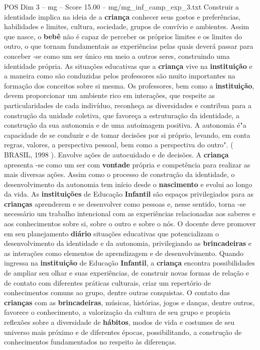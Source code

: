 \begin{textsample}{POS Dim 3 – mg – Score 15.00 – mg/mg\_inf\_camp\_exp\_3.txt}
Construir a identidade implica na ideia de a \textbf{criança} conhecer seus gostos e preferências, habilidades e limites, cultura, sociedade, grupos de convívio e ambientes.
Assim que nasce, o \textbf{bebê} não é capaz de perceber os próprios limites e os limites do outro, o que tornam fundamentais as experiências pelas quais deverá passar para conceber -se como um ser único em meio a outros seres, construindo uma identidade própria.
As situações educativas que a \textbf{criança} vive na \textbf{instituição} e a maneira como são conduzidas pelos professores são muito importantes na formação dos conceitos sobre si mesma.
Os professores, bem como a \textbf{instituição}, devem proporcionar um ambiente rico em interações, que respeite as particularidades de cada indivíduo, reconheça as diversidades e contribua para a construção da unidade coletiva, que favoreça a estruturação da identidade, a construção da sua autonomia e de uma autoimagem positiva.
A autonomia é"a capacidade de se conduzir e de tomar decisões por si próprio, levando, em conta regras, valores, a perspectiva pessoal, bem como a perspectiva do outro". ( BRASIL, 1998 ).
Envolve ações de autocuidado e de decisões.
A \textbf{criança} apresenta -se como um ser com \textbf{vontade} própria e competência para realizar as mais diversas ações.
Assim como o processo de construção da identidade, o desenvolvimento da autonomia tem início desde o \textbf{nascimento} e evolui ao longo da vida.
As \textbf{instituições} de Educação \textbf{Infantil} são espaços privilegiados para as \textbf{crianças} aprenderem e se desenvolver como pessoas e, nesse sentido, torna -se necessário um trabalho intencional com as experiências relacionadas aos saberes e aos conhecimentos sobre si, sobre o outro e sobre o nós.
O docente deve promover em seu planejamento \textbf{diário} situações educativas que potencializam o desenvolvimento da identidade e da autonomia, privilegiando as \textbf{brincadeiras} e as interações como elementos de aprendizagem e de desenvolvimento.
Quando ingressa na \textbf{instituição} de Educação \textbf{Infantil}, a \textbf{criança} encontra possibilidades de ampliar seu olhar e suas experiências, de construir novas formas de relação e de contato com diferentes práticas culturais, criar um repertório de conhecimentos comuns ao grupo, dentre outras conquistas.
O contato das \textbf{crianças} com as \textbf{brincadeiras}, músicas, histórias, jogos e danças, dentre outros, favorece o conhecimento, a valorização da cultura de seu grupo e propicia reflexões sobre a diversidade de \textbf{hábitos}, modos de vida e costumes de seu universo mais próximo e de diferentes épocas, possibilitando, a construção de conhecimentos fundamentados no respeito às diferenças.

\end{textsample}
